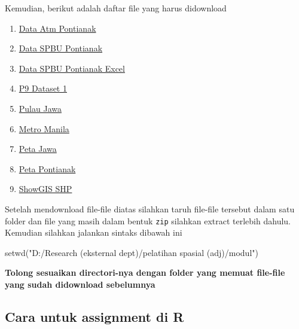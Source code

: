 \documentclass[
]{book}
\newenvironment{Shaded}{\begin{snugshade}}{\end{snugshade}}
\newcommand{\FunctionTok}[1]{\textcolor[rgb]{0.00,0.00,0.00}{#1}}
\newcommand{\NormalTok}[1]{#1}
\newcommand{\StringTok}[1]{\textcolor[rgb]{0.31,0.60,0.02}{#1}}
\providecommand{\tightlist}{%
  \setlength{\itemsep}{0pt}\setlength{\parskip}{0pt}}
\begin{document}
Kemudian, berikut adalah daftar file yang harus didownload

\begin{enumerate}
\def\labelenumi{\arabic{enumi}.}
\tightlist
\item
  \href{https://github.com/raoy/Pelatihan-Spasial/raw/main/DATA\%20ATM\%20PONTIANAK.csv}{Data Atm Pontianak}
\item
  \href{https://github.com/raoy/Pelatihan-Spasial/raw/main/Data\%20SPBU\%20Pontianak.csv}{Data SPBU Pontianak}
\item
  \href{https://github.com/raoy/Pelatihan-Spasial/raw/main/Data\%20SPBU\%20Pontianak.xlsx}{Data SPBU Pontianak Excel}
\item
  \href{https://github.com/raoy/Pelatihan-Spasial/raw/main/P9\%20Dataset\%201.xlsx}{P9 Dataset 1}
\item
  \href{https://github.com/raoy/Pelatihan-Spasial/raw/main/Pulau\%20Jawa.csv}{Pulau Jawa}
\item
  \href{https://github.com/raoy/Pelatihan-Spasial/raw/main/metromanila.csv}{Metro Manila}
\item
  \href{https://github.com/raoy/Pelatihan-Spasial/raw/main/Jawamap.zip}{Peta Jawa}
\item
  \href{https://github.com/raoy/Pelatihan-Spasial/raw/main/Peta\%20Pontianak.zip}{Peta Pontianak}
\item
  \href{https://github.com/raoy/Pelatihan-Spasial/raw/main/SnowGIS_SHP.zip}{ShowGIS SHP}
\end{enumerate}

Setelah mendownload file-file diatas silahkan taruh file-file tersebut dalam satu folder dan file yang masih dalam bentuk \texttt{zip} silahkan extract terlebih dahulu. Kemudian silahkan jalankan sintaks dibawah ini

\begin{Shaded}
\begin{Highlighting}[]
\FunctionTok{setwd}\NormalTok{(}\StringTok{"D:/Research (eksternal dept)/pelatihan spasial (adj)/modul"}\NormalTok{)}
\end{Highlighting}
\end{Shaded}

\textbf{Tolong sesuaikan directori-nya dengan folder yang memuat file-file yang sudah didownload sebelumnya}

\hypertarget{cara-untuk-assignment-di-r}{%
\subsection{Cara untuk assignment di R}\label{cara-untuk-assignment-di-r}}
\end{document}
